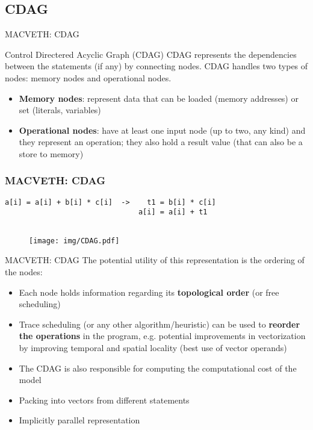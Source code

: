 \documentclass[xcolor=table,hideothersubsections,aspectratio=1610]{beamer}
\begin{document}
\subsection{CDAG}
\begin{frame}{MACVETH: CDAG}
    \begin{block}{Control Directered Acyclic Graph (CDAG)}
        CDAG represents the dependencies between the statements (if any) by connecting nodes. CDAG handles two types of nodes: memory nodes and operational nodes.
    \end{block}
    \begin{itemize}
        \item \textbf{Memory nodes}: represent data that can be loaded (memory addresses) or set (literals, variables)
        \item \textbf{Operational nodes}: have at least one input node (up to two, any kind) and they represent an operation; they also hold a result value (that can also be a store to memory)
    \end{itemize}
\end{frame}

\begin{frame}[fragile]
    \frametitle{MACVETH: CDAG}
    \begin{verbatim}
a[i] = a[i] + b[i] * c[i]  ->    t1 = b[i] * c[i]
                               a[i] = a[i] + t1
                                
\end{verbatim}

    \begin{figure}
        \centering
        \texttt{[image: img/CDAG.pdf]}
    \end{figure}
\end{frame}

\begin{frame}{MACVETH: CDAG}
    The potential utility of this representation is the ordering of the nodes:
    \begin{itemize}
        \item Each node holds information regarding its \textbf{topological order} (or free scheduling)
        \item Trace scheduling (or any other algorithm/heuristic) can be used to \textbf{reorder the operations} in the program, e.g. potential improvements in vectorization by improving temporal and spatial locality (best use of vector operands)
        \item The CDAG is also responsible for computing the computational cost of the model
        \item Packing into vectors from different statements
        \item Implicitly parallel representation
    \end{itemize}
\end{frame}
\end{document}
